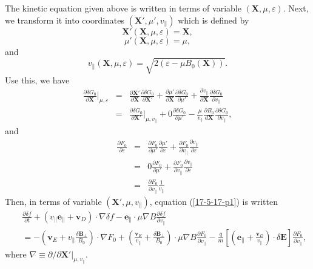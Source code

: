 \documentclass{article}
\newcommand{\nobracket}{}
\begin{document}
The kinetic equation given above is written in terms of variable $(\mathbf{X},
\mu, \varepsilon)$. Next, we transform it into coordinates $(\mathbf{X}',
\mu', v_{\parallel})$ which is defined by
\begin{equation}
  \mathbf{X}' (\mathbf{X}, \mu, \varepsilon) =\mathbf{X},
\end{equation}
\begin{equation}
  \mu' (\mathbf{X}, \mu, \varepsilon) = \mu,
\end{equation}
and
\begin{equation}
  v_{\parallel} (\mathbf{X}, \mu, \varepsilon) = \sqrt{2 (\varepsilon - \mu
  B_0 (\mathbf{X}))} .
\end{equation}
Use this, we have
\begin{eqnarray}
  \frac{\partial \delta G_0}{\partial \mathbf{X}} |_{\mu, \varepsilon}
  \nobracket & = & \frac{\partial \mathbf{X}'}{\partial \mathbf{X}} 
  \frac{\partial \delta G_0}{\partial \mathbf{X}'} + \frac{\partial
  \mu'}{\partial \mathbf{X}}  \frac{\partial \delta G_0}{\partial \mu'} +
  \frac{\partial v_{\parallel}}{\partial \mathbf{X}}  \frac{\partial \delta
  G_0}{\partial v_{\parallel}} \nonumber\\
  & = & \frac{\partial \delta G_0}{\partial \mathbf{X}'} |_{\mu,
  v_{\parallel}} \nobracket + 0 \frac{\partial \delta G_0}{\partial \mu'} -
  \frac{\mu}{v_{\parallel}}  \frac{\partial B_0}{d\mathbf{X}} \frac{\partial
  \delta G_0}{\partial v_{\parallel}}, 
\end{eqnarray}
and
\begin{eqnarray}
  \frac{\partial F_0}{\partial \varepsilon} & = & \frac{\partial F_0}{\partial
  \mu'}  \frac{\partial \mu'}{\partial \varepsilon} + \frac{\partial
  F_0}{\partial v_{\parallel}}  \frac{\partial v_{\parallel}}{\partial
  \varepsilon} \nonumber\\
  & = & 0 \frac{\partial F_0}{\partial \mu'} + \frac{\partial F_0}{\partial
  v_{\parallel}}  \frac{\partial v_{\parallel}}{\partial \varepsilon}
  \nonumber\\
  & = & \frac{\partial F_0}{\partial v_{\parallel}}  \frac{1}{v_{\parallel}} 
\end{eqnarray}
Then, in terms of variable $(\mathbf{X}', \mu, v_{\parallel})$, equation
(\ref{17-5-17-p1}) is written
\begin{eqnarray}
  &  & \frac{\partial \delta f}{\partial t} + (v_{\parallel}
  \mathbf{e}_{\parallel} +\mathbf{v}_D) \cdot \nabla \delta f
  -\mathbf{e}_{\parallel} \cdot \mu \nabla B \frac{\partial \delta f}{\partial
  v_{\parallel}} \nonumber\\
  &  & = - \left( \mathbf{v}_E + v_{\parallel} \frac{\delta
  \mathbf{B}_{\perp}}{B_0} \right) \cdot \nabla F_0 + \left(
  \frac{\mathbf{v}_E}{v_{\parallel}} + \frac{\delta \mathbf{B}_{\perp}}{B_0}
  \right) \cdot \mu \nabla B \frac{\partial F_0}{\partial v_{\parallel}} -
  \frac{q}{m} \left[ \left( \mathbf{e}_{\parallel} +
  \frac{\mathbf{v}_D}{v_{\parallel}} \right) \cdot \delta \mathbf{E} \right]
  \frac{\partial F_0}{\partial v_{\parallel}},  \label{17-5-14-e3}
\end{eqnarray}
where $\nabla \equiv \partial / \partial \mathbf{X}' |_{\mu, v_{\parallel}}
\nobracket$.
\end{document}
